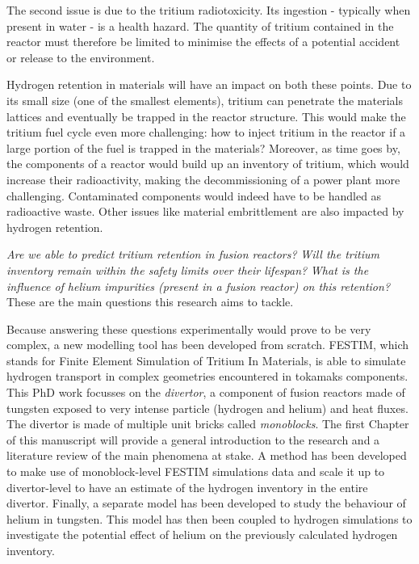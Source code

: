 The second issue is due to the tritium radiotoxicity.
Its ingestion - typically when present in water - is a health hazard.
The quantity of tritium contained in the reactor must therefore be limited to minimise the effects of a potential accident or release to the environment.

Hydrogen retention in materials will have an impact on both these points.
Due to its small size (one of the smallest elements), tritium can penetrate the materials lattices and eventually be trapped in the reactor structure.
This would make the tritium fuel cycle even more challenging: how to inject tritium in the reactor if a large portion of the fuel is trapped in the materials?
Moreover, as time goes by, the components of a reactor would build up an inventory of tritium, which would increase their radioactivity, making the decommissioning of a power plant more challenging.
Contaminated components would indeed have to be handled as radioactive waste.
Other issues like material embrittlement are also impacted by hydrogen retention.

\emph{Are we able to predict tritium retention in fusion reactors?}\newline
\emph{Will the tritium inventory remain within the safety limits over their lifespan?}\newline
\emph{What is the influence of helium impurities (present in a fusion reactor) on this retention?}\newline
These are the main questions this research aims to tackle.

Because answering these questions experimentally would prove to be very complex, a new modelling tool has been developed from scratch.
FESTIM, which stands for Finite Element Simulation of Tritium In Materials, is able to simulate hydrogen transport in complex geometries encountered in tokamaks components.
This PhD work focusses on the \textit{divertor}, a component of fusion reactors made of tungsten exposed to very intense particle (hydrogen and helium) and heat fluxes. 
The divertor is made of multiple unit bricks called \textit{monoblocks}.
The first Chapter of this manuscript will provide a general introduction to the research and a literature review of the main phenomena at stake.
A method has been developed to make use of monoblock-level FESTIM simulations data and scale it up to divertor-level to have an estimate of the hydrogen inventory in the entire divertor.
Finally, a separate model has been developed to study the behaviour of helium in tungsten.
This model has then been coupled to hydrogen simulations to investigate the potential effect of helium on the previously calculated hydrogen inventory.
